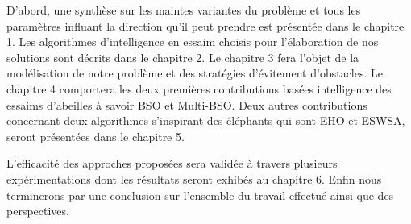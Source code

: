 D'abord, une synthèse sur les maintes variantes du problème et tous les paramètres influant la direction qu'il peut prendre est présentée dans le chapitre 1.
Les algorithmes d'intelligence en essaim choisis pour l'élaboration de nos solutions sont décrits dans le chapitre 2.
Le chapitre 3 fera l'objet de la modélisation de notre problème et des stratégies d'évitement d'obstacles.
Le chapitre 4 comportera les deux premières contributions basées intelligence des essaims d'abeilles à savoir BSO et Multi-BSO. Deux autres contributions concernant deux algorithmes s'inspirant des éléphants qui sont EHO et ESWSA, seront présentées dans le chapitre 5.

L'efficacité des approches proposées sera validée à travers plusieurs expérimentations dont les résultats seront exhibés au chapitre 6. 
Enfin nous terminerons par une conclusion sur l'ensemble du travail effectué ainsi que des perspectives.








